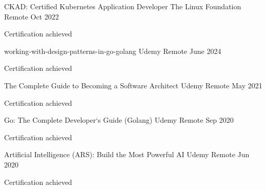

\begin{cventries}

  \cventry
    {CKAD: Certified Kubernetes Application Developer} %
    {The Linux Foundation} %
    {Remote} %
    {Oct 2022} %
    {
      \begin{cvitems} %
        \item {Certification achieved}
      \end{cvitems}
    }

  \cventry
    {working-with-design-patterns-in-go-golang} %
    {Udemy} %
    {Remote} %
    {June 2024} %
    {
      \begin{cvitems} %
        \item {Certification achieved}
      \end{cvitems}
    }
  \cventry
    {The Complete Guide to Becoming a Software Architect} %
    {Udemy} %
    {Remote} %
    {May 2021} %
    {
      \begin{cvitems} %
        \item {Certification achieved}
      \end{cvitems}
    }
  \cventry
    {Go: The Complete Developer`s Guide (Golang)} %
    {Udemy} %
    {Remote} %
    {Sep 2020} %
    {
      \begin{cvitems} %
        \item {Certification achieved}
      \end{cvitems}
    }
  \cventry
    {Artificial Intelligence (ARS): Build the Most Powerful AI} %
    {Udemy} %
    {Remote} %
    {Jun 2020} %
    {
      \begin{cvitems} %
        \item {Certification achieved}
      \end{cvitems}
    }
\end{cventries}
